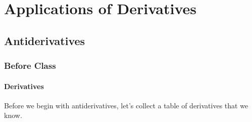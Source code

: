 \documentclass[notes]{subfiles}
\begin{document}
	\setcounter{chapter}{2}
	\chapter{Applications of Derivatives}
	\setcounter{section}{9}
	\setcounter{ex}{0}
	\fancyhead[LO,RE]{\bfseries \currentname}
	\fancyfoot[C]{{}}
	\fancyfoot[RO,LE]{\large \thepage}	%
	
\section*{Antiderivatives}\label{cs39}
	\subsection*{Before Class}
	\subsubsection*{Derivatives}
		Before we begin with antiderivatives, let's collect a table of derivatives that we know.
		\newpage
		
\end{document}

